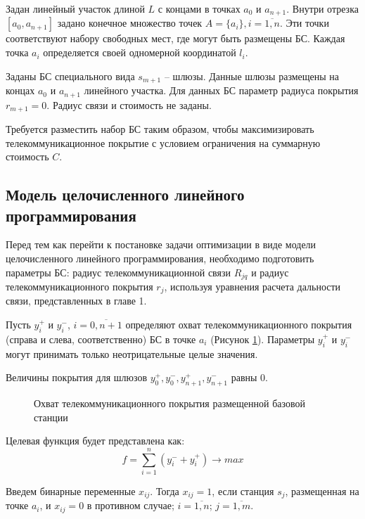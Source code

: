 Задан линейный участок длиной $L$ с концами в точках $a_0$ и $a_{n+1}$. Внутри  отрезка $[a_0, a_{n+1}]$ задано конечное множество точек $A=\{a_i\}, i=\overline{1,n}$. Эти точки соответствуют набору свободных мест, где могут быть размещены БС. Каждая точка $a_i$ определяется своей одномерной координатой $l_i$.

Заданы БС специального вида $s_{m+1}$ -- шлюзы. Данные шлюзы размещены на концах $a_0$ и $a_{n+1}$ линейного участка. Для данных БС параметр радиуса покрытия $r_{m+1}=0$. Радиус связи и стоимость не заданы.

Требуется разместить набор БС таким образом, чтобы максимизировать телекоммуникационное покрытие с условием ограничения на суммарную стоимость $C$.


\subsection{Модель целочисленного линейного программирования}

Перед тем как перейти к постановке задачи оптимизации в виде модели целочисленного линейного программирования, необходимо подготовить параметры БС: радиус телекоммуникационной связи $R_{jq}$ и радиус телекоммуникационного покрытия $r_j$, используя  уравнения расчета дальности связи, представленных в главе 1.



Пусть $y_i^+$ и $y_i^-$, $i= \overline{0,n+1}$ определяют охват телекоммуникационного покрытия (справа и слева, соответственно) БС в точке $a_i$ (Рисунок \cref{fig:part3_station_coverage}). Параметры $y_i^+$ и $y_i^-$ могут принимать только неотрицательные целые значения.

Величины  покрытия для шлюзов $y_0^+, y_0^-, y_{n+1}^+, y_{n+1}^-$ равны 0.

\begin{figure}[ht]
  \caption{Охват телекоммуникационного покрытия размещенной базовой станции}\label{fig:part3_station_coverage}
\end{figure}
 
Целевая функция будет представлена как:
\begin{equation}
  \label{eq:part3_objective_function}
  f =  \sum\limits_{i=1}^n (y_i^- + y_i^+) \rightarrow max
\end{equation}

Введем бинарные переменные $x_{ij}$. Тогда $x_{ij}=1$, если станция $s_j$, размещенная на точке $a_i$, и $x_{ij}=0$ в противном случае; $i= \overline{1, n}$; $j = \overline{1,m}$.

